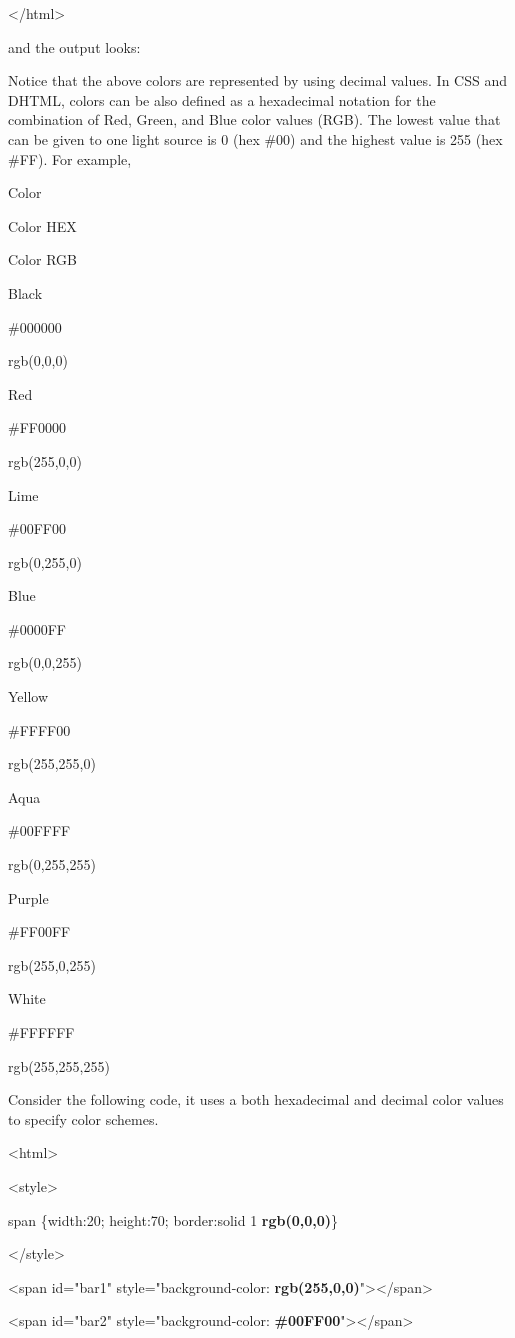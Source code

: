 \documentclass[
]{article}
\begin{document}
\textless/html\textgreater{}

and the output looks:

Notice that the above colors are represented by using decimal values. In
CSS and DHTML, colors can be also defined as a hexadecimal notation for
the combination of Red, Green, and Blue color values (RGB). The lowest
value that can be given to one light source is 0 (hex \#00) and the
highest value is 255 (hex \#FF). For example,

Color

Color HEX

Color RGB

Black

\#000000

rgb(0,0,0)

Red

\#FF0000

rgb(255,0,0)

Lime

\#00FF00

rgb(0,255,0)

Blue

\#0000FF

rgb(0,0,255)

Yellow

\#FFFF00

rgb(255,255,0)

Aqua

\#00FFFF

rgb(0,255,255)

Purple

\#FF00FF

rgb(255,0,255)

White

\#FFFFFF

rgb(255,255,255)

Consider the following code, it uses a both hexadecimal and decimal
color values to specify color schemes.

\textless html\textgreater{}

\textless style\textgreater{}

span \{width:20; height:70; border:solid 1 \textbf{rgb(0,0,0)}\}

\textless/style\textgreater{}

\textless span id="bar1" style="background-color:
\textbf{rgb(255,0,0)}"\textgreater\textless/span\textgreater{}

\textless span id="bar2" style="background-color:
\textbf{\#00FF00}"\textgreater\textless/span\textgreater{}
\end{document}
